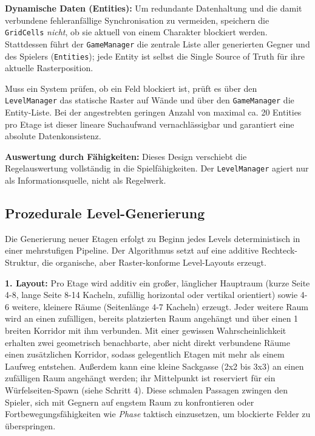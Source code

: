 \documentclass[oneside]{ausarbeitung}
\begin{document}
\textbf{Dynamische Daten (Entities):}
Um redundante Datenhaltung und die damit verbundene fehleranfällige Synchronisation zu vermeiden, speichern die \texttt{GridCells} \textit{nicht}, ob sie aktuell von einem Charakter blockiert werden. 
Stattdessen führt der \texttt{GameManager} die zentrale Liste aller generierten Gegner und des Spielers (\texttt{Entities}); jede Entity ist selbst die Single Source of Truth für ihre aktuelle Rasterposition.

Muss ein System prüfen, ob ein Feld blockiert ist, prüft es über den \texttt{LevelManager} das statische Raster auf Wände und über den \texttt{GameManager} die Entity-Liste. Bei der angestrebten geringen Anzahl von maximal ca. 20 Entities pro Etage ist dieser lineare Suchaufwand vernachlässigbar und garantiert eine absolute Datenkonsistenz.

\textbf{Auswertung durch Fähigkeiten:}
Dieses Design verschiebt die Regelauswertung vollständig in die Spielfähigkeiten. Der \texttt{LevelManager} agiert nur als Informationsquelle, nicht als Regelwerk.

\subsection{Prozedurale Level-Generierung}

Die Generierung neuer Etagen erfolgt zu Beginn jedes Levels deterministisch in einer mehrstufigen Pipeline. Der Algorithmus setzt auf eine additive Rechteck-Struktur, die organische, aber Raster-konforme Level-Layouts erzeugt.

\textbf{1. Layout:}
Pro Etage wird additiv ein großer, länglicher Hauptraum (kurze Seite 4-8, lange Seite 8-14 Kacheln, zufällig horizontal oder vertikal orientiert) sowie 4-6 weitere, kleinere Räume (Seitenlänge 4-7 Kacheln) erzeugt. Jeder weitere Raum wird an einen zufälligen, bereits platzierten Raum angehängt und über einen 1 breiten Korridor mit ihm verbunden. Mit einer gewissen Wahrscheinlichkeit erhalten zwei geometrisch benachbarte, aber nicht direkt verbundene Räume einen zusätzlichen Korridor, sodass gelegentlich Etagen mit mehr als einem Laufweg entstehen. Außerdem kann eine kleine Sackgasse (2x2 bis 3x3) an einen zufälligen Raum angehängt werden; ihr Mittelpunkt ist reserviert für ein Würfelseiten-Spawn (siehe Schritt 4). Diese schmalen Passagen zwingen den Spieler, sich mit Gegnern auf engstem Raum zu konfrontieren oder Fortbewegungsfähigkeiten wie \textit{Phase} taktisch einzusetzen, um blockierte Felder zu überspringen.
\end{document}
